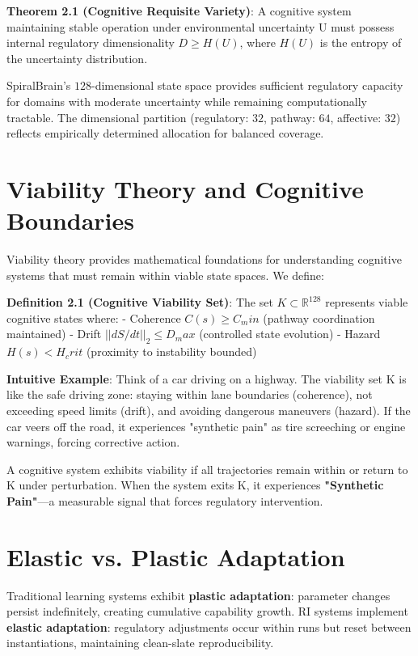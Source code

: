 \documentclass[12pt,a4paper]{report}
\newcommand{\geqU}{\geq}
\newcommand{\leqU}{\leq}
\newcommand{\subsetU}{\subset}
\newcommand{\Rset}{\mathbb{R}}
\newcommand{\suponehundredtwentyeight}{^{128}}
\newcommand{\subtwo}{_2}
\begin{document}
\textbf{Theorem 2.1 (Cognitive Requisite Variety)}: A cognitive system maintaining stable operation under environmental uncertainty U must possess internal regulatory dimensionality $D \geqU H(U)$, where $H(U)$ is the entropy of the uncertainty distribution.

SpiralBrain's $128$-dimensional state space provides sufficient regulatory capacity for domains with moderate uncertainty while remaining computationally tractable. The dimensional partition (regulatory: $32$, pathway: $64$, affective: $32$) reflects empirically determined allocation for balanced coverage.

\section{Viability Theory and Cognitive Boundaries}

Viability theory \cite{aubin1991viability} provides mathematical foundations for understanding cognitive systems that must remain within viable state spaces. We define:

\textbf{Definition 2.1 (Cognitive Viability Set)}: The set $K \subsetU \Rset\suponehundredtwentyeight$ represents viable cognitive states where:
- Coherence $C(s) \geqU C_min$ (pathway coordination maintained)
- Drift $||dS/dt||\subtwo \leqU D_max$ (controlled state evolution)
- Hazard $H(s) < H_crit$ (proximity to instability bounded)

\textbf{Intuitive Example}: Think of a car driving on a highway. The viability set K is like the safe driving zone: staying within lane boundaries (coherence), not exceeding speed limits (drift), and avoiding dangerous maneuvers (hazard). If the car veers off the road, it experiences "synthetic pain" as tire screeching or engine warnings, forcing corrective action.

A cognitive system exhibits viability if all trajectories remain within or return to K under perturbation. When the system exits K, it experiences \textbf{"Synthetic Pain"}—a measurable signal that forces regulatory intervention.

\section{Elastic vs. Plastic Adaptation}

Traditional learning systems exhibit \textbf{plastic adaptation}: parameter changes persist indefinitely, creating cumulative capability growth. RI systems implement \textbf{elastic adaptation}: regulatory adjustments occur within runs but reset between instantiations, maintaining clean-slate reproducibility.
\end{document}
